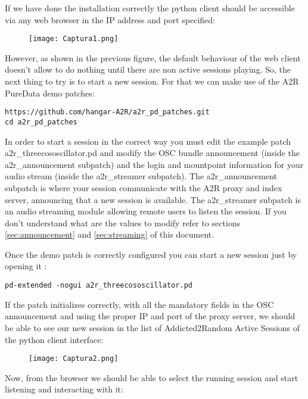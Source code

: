 \documentclass{article}
\begin{document}
If we have done the installation correctly the python client should be accessible via any web browser in the IP address and port specified:

\begin{figure}[htbp]
\centering
\texttt{[image: Captura1.png]}
\label{fig:capt1}
\end{figure}

However, as shown in the previous figure, the default behaviour of the web client doesn't allow to do nothing until there are non active sessions playing. So, the next thing to try is to start a new session. For that we can make use of the A2R PureData demo patches:

\begin{Verbatim}
https://github.com/hangar-A2R/a2r_pd_patches.git
cd a2r_pd_patches
\end{Verbatim}

In order to start a session in the correct way you must edit the example patch a2r\_threecososcillator.pd and modify the OSC bundle announcement (inside the a2r\_announcement subpatch) and the login and mountpoint information for your audio stream (inside the a2r\_streamer subpatch). The a2r\_announcement subpatch is where your session communicate with the A2R proxy and index server, announcing that a new session is available. The a2r\_streamer subpatch is an audio streaming module allowing remote users to listen the session. If you don't understand what are the values to modify refer to sections \ref{sec:announcement} and \ref{sec:streaming} of this document.

Once the demo patch is correctly configured you can start a new session just by opening it : 

\begin{Verbatim}
pd-extended -nogui a2r_threecososcillator.pd
\end{Verbatim}

If the patch initializes correctly, with all the mandatory fields in the OSC announcement and using the proper IP and port of the proxy server, we should be able to see our new session in the list of Addicted2Random Active Sessions of the python client interface:

\begin{figure}[htbp]
\centering
\texttt{[image: Captura2.png]}
\label{fig:capt2}
\end{figure}

Now, from the browser we should be able to select the running session and start listening and interacting with it:
\end{document}

